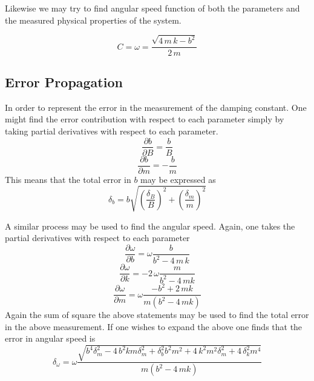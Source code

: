 \documentclass[11pt]{article}
\begin{document}
Likewise we may try to  find angular speed function of both the parameters and the measured physical properties of the system.

\[C = \omega = \frac{\sqrt{4 \, m \, k - b^2}}{2 \, m}\]

\subsection{Error Propagation}
In order to represent the error in the measurement of the damping constant. One might find the  error contribution with respect to each parameter simply by taking partial derivatives with respect to each parameter.
\[\frac{\partial b}{\partial B} = \frac{b}{B} \]
\[\frac{\partial b}{\partial m} = - \frac{b}{m} \]
This means that the total error in \(b\) may be expressed as
\[ \delta_b = b \sqrt{\left(\frac{\delta_B}{B}\right)^2+\left(\frac{\delta_m}{m}\right)^2}\]

A similar process may be used to find the angular speed. Again, one takes the partial derivatives with respect to each parameter
\[ \frac{\partial \omega}{\partial b} = \omega {\frac {b}{{b}^{2}-4\,m \, k}}\]
\[ \frac{\partial \omega}{\partial k} = -2 \, \omega {\frac {m}{{b}^{2}-4\,mk}}\]
\[ \frac{\partial \omega}{\partial m} = \omega {\frac {-{b}^{2}+2\,mk}{m \left( {b}^{2}-4\,mk \right) }}\]
Again the sum of square the above statements may be used to find the total error in the above measurement. If one wishes to expand the above one finds that the error in angular speed is 
\[\delta_{\omega} = \omega {\frac {\sqrt {{b}^{4}\delta_m^{2}-4\,{b}^{2}km\delta_{{m}}^{2
			}+\delta_{{b}}^{2}{b}^{2}{m}^{2}+4\,{k}^{2}{m}^{2}\delta_{{m}}^{2}
			+4\,\delta_{{k}}^{2}{m}^{4}}}{m \left( {b}^{2}-4\,mk \right) }}
 \]
\end{document}
